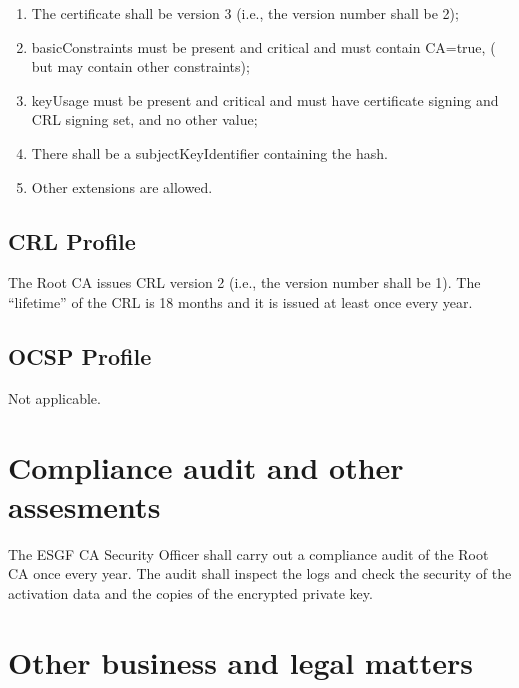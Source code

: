 \begin{enumerate}
\item
  
  The certificate shall be version 3 (i.e., the version number shall be
  2);
  
\item
  
  basicConstraints must be present and critical and must contain
  CA=true, ( but may contain other constraints);
  
\item
  
  keyUsage must be present and critical and must have certificate
  signing and CRL signing set, and no other value;
  
\item
  
  There shall be a subjectKeyIdentifier containing the hash.
  
\item
  
  Other extensions are allowed.
  
\end{enumerate}

\subsection{CRL Profile}\label{crl-profile}

The Root CA issues CRL version 2 (i.e., the version number shall be 1).
The ``lifetime'' of the CRL is 18 months and it is issued at least once
every year.

\subsection{OCSP Profile}\label{ocsp-profile}

Not applicable.

\section{Compliance audit and other assesments}\label{compliance-audit-and-other-assessments}

The ESGF CA Security Officer shall carry out a compliance audit of the Root
CA once every year. The audit shall inspect the logs and check the
security of the activation data and the copies of the encrypted private
key.

\section{Other business and legal matters}\label{other-business-and-legal-matters}

